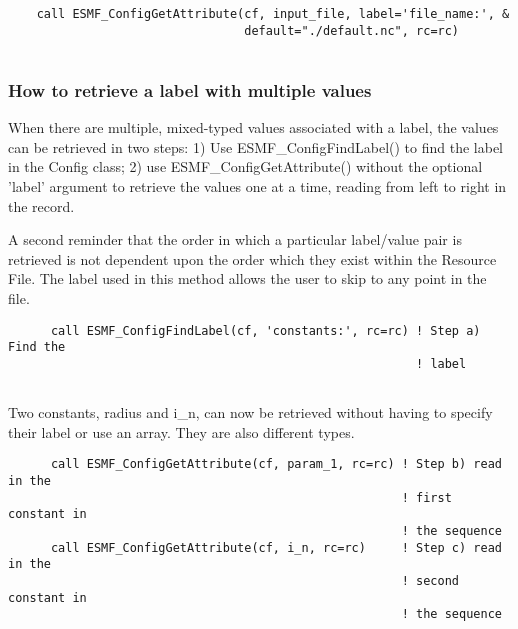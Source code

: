  \begin{verbatim}
    call ESMF_ConfigGetAttribute(cf, input_file, label='file_name:', &
                                 default="./default.nc", rc=rc)
 
\end{verbatim}
 

  \subsubsection{How to retrieve a label with multiple values}
   When there are multiple, mixed-typed values associated with a label, the 
   values can be retrieved in two steps:  1) Use ESMF\_ConfigFindLabel() 
   to find the label in the Config class; 2) use
   ESMF\_ConfigGetAttribute() without the optional 'label' argument to 
   retrieve the values one at a time, reading from left to right in
   the record. 
  
   A second reminder that the order in which a particular label/value pair is 
   retrieved is not dependent upon the order which they exist within the 
   Resource File. The label used in this method allows the user to skip to
   any point in the file.  

 \begin{verbatim}
      call ESMF_ConfigFindLabel(cf, 'constants:', rc=rc) ! Step a) Find the 
                                                         ! label 
 
\end{verbatim}
 

   Two constants, radius and i\_n, can now be retrieved without having to specify their
   label or use an array. They are also different types. 

 \begin{verbatim}
      call ESMF_ConfigGetAttribute(cf, param_1, rc=rc) ! Step b) read in the 
                                                       ! first constant in 
                                                       ! the sequence
      call ESMF_ConfigGetAttribute(cf, i_n, rc=rc)     ! Step c) read in the 
                                                       ! second constant in 
                                                       ! the sequence
 
\end{verbatim}
 
